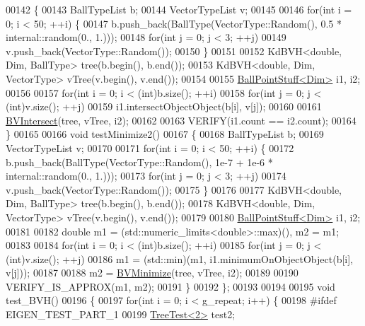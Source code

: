 \begin{DoxyCode}
00142   \{
00143     BallTypeList b;
00144     VectorTypeList v;
00145 
00146     \textcolor{keywordflow}{for}(\textcolor{keywordtype}{int} i = 0; i < 50; ++i) \{
00147         b.push\_back(BallType(VectorType::Random(), 0.5 * internal::random(0., 1.)));
00148         \textcolor{keywordflow}{for}(\textcolor{keywordtype}{int} j = 0; j < 3; ++j)
00149             v.push\_back(VectorType::Random());
00150     \}
00151 
00152     KdBVH<double, Dim, BallType> tree(b.begin(), b.end());
00153     KdBVH<double, Dim, VectorType> vTree(v.begin(), v.end());
00154 
00155     \hyperlink{struct_ball_point_stuff}{BallPointStuff<Dim>} i1, i2;
00156 
00157     \textcolor{keywordflow}{for}(\textcolor{keywordtype}{int} i = 0; i < (int)b.size(); ++i)
00158         \textcolor{keywordflow}{for}(\textcolor{keywordtype}{int} j = 0; j < (int)v.size(); ++j)
00159             i1.intersectObjectObject(b[i], v[j]);
00160 
00161     \hyperlink{namespace_eigen_a07d8e283f082c972338f3fc4f644b2a9}{BVIntersect}(tree, vTree, i2);
00162 
00163     VERIFY(i1.count == i2.count);
00164   \}
00165 
00166   \textcolor{keywordtype}{void} testMinimize2()
00167   \{
00168     BallTypeList b;
00169     VectorTypeList v;
00170 
00171     \textcolor{keywordflow}{for}(\textcolor{keywordtype}{int} i = 0; i < 50; ++i) \{
00172         b.push\_back(BallType(VectorType::Random(), 1e-7 + 1e-6 * internal::random(0., 1.)));
00173         \textcolor{keywordflow}{for}(\textcolor{keywordtype}{int} j = 0; j < 3; ++j)
00174             v.push\_back(VectorType::Random());
00175     \}
00176 
00177     KdBVH<double, Dim, BallType> tree(b.begin(), b.end());
00178     KdBVH<double, Dim, VectorType> vTree(v.begin(), v.end());
00179 
00180     \hyperlink{struct_ball_point_stuff}{BallPointStuff<Dim>} i1, i2;
00181 
00182     \textcolor{keywordtype}{double} m1 = (std::numeric\_limits<double>::max)(), m2 = m1;
00183 
00184     \textcolor{keywordflow}{for}(\textcolor{keywordtype}{int} i = 0; i < (int)b.size(); ++i)
00185         \textcolor{keywordflow}{for}(\textcolor{keywordtype}{int} j = 0; j < (int)v.size(); ++j)
00186             m1 = (std::min)(m1, i1.minimumOnObjectObject(b[i], v[j]));
00187 
00188     m2 = \hyperlink{namespace_eigen_adcbe73ac1482eacab0e18ee32c25508e}{BVMinimize}(tree, vTree, i2);
00189 
00190     VERIFY\_IS\_APPROX(m1, m2);
00191   \}
00192 \};
00193 
00194 
00195 \textcolor{keywordtype}{void} test\_BVH()
00196 \{
00197   \textcolor{keywordflow}{for}(\textcolor{keywordtype}{int} i = 0; i < g\_repeat; i++) \{
00198 \textcolor{preprocessor}{#ifdef EIGEN\_TEST\_PART\_1}
00199     \hyperlink{struct_tree_test}{TreeTest<2>} test2;

\end{DoxyCode}
